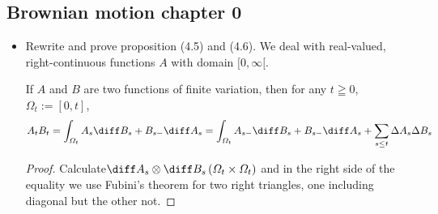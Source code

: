 \subsection{Brownian motion chapter 0}
\begin{itemize}
\item Rewrite and prove proposition (4.5) and (4.6). We deal with real-valued, right-continuous functions $A$ with domain $[0, \infty[.$
\begin{lemma}\label{thm: int_by_part}
If $A$ and $B$ are two functions
of finite variation, then for any $t\geqq0$, $ \varOmega_t :=[0,t]$,
\[
A_{t} B_{t}=\int_{\varOmega_t} A_{s} \diff B_{s}+ B_{s-} \diff A_{s}
=\int_{\varOmega_t} A_{s-} \diff B_{s}+ B_{s-} \diff A_{s}+\sum_{s \leq t} \Delta A_{s}\Delta B_{s}
\]
\end{lemma}

\begin{proof}
Calculate$\diff A_{s} \otimes\diff B_{s}\left(\varOmega_t\times\varOmega_t\right)$ and in the right side of the equality we use Fubini's theorem for two right triangles, one including diagonal but the other not.
\end{proof}


\end{itemize}
